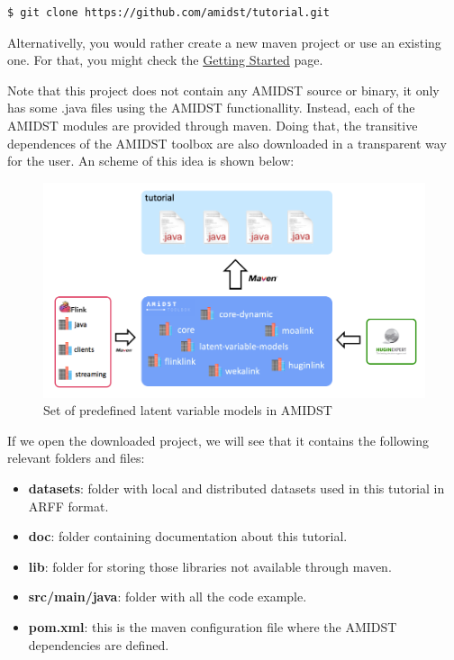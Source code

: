 \documentclass[10pt,a4paper]{article}
\begin{document}
\begin{verbatim}
$ git clone https://github.com/amidst/tutorial.git      
\end{verbatim}


Alternativelly, you would rather create a new maven project or use an existing one. For that, you might check the \href{../GettingStarted/index.html}{Getting Started} page.\newline 

Note that this project does not contain any AMIDST source or binary, it only has some .java files using the AMIDST functionallity. Instead, each of the AMIDST modules are provided through maven. Doing that, the transitive dependences of the AMIDST toolbox are also downloaded in a transparent way for the user. An scheme of this idea is shown below:

 
\begin{figure}[h!]
	\centering
	\includegraphics[width=13cm]{img/overview.png}
	\caption{Set of predefined latent variable models in AMIDST}
	\label{fig:lvmodels:overview}	
\end{figure}


\newpage 
If we open the downloaded project, we will see that it contains the following relevant folders and files:

\begin{itemize}
	\item \textbf{datasets}: folder with local and distributed datasets used in this tutorial in ARFF format.
	\item \textbf{doc}: folder containing documentation about this tutorial.
	\item \textbf{lib}: folder for storing those libraries not available through maven.
	\item \textbf{src/main/java}: folder with all the code example.
	\item \textbf{pom.xml}: this is the maven configuration file where the AMIDST dependencies are defined.
\end{itemize}
\end{document}
